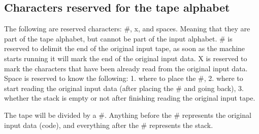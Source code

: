 \documentclass{article}
\begin{document}
\subsection{Characters reserved for the tape alphabet}
The following are reserved characters: #, x, and spaces. Meaning that they are part of the tape alphabet, but cannot be part of the 
input alphabet. # is reserved to delimit the end of the original input tape, as soon as the machine starts running it will mark the 
end of the original input data. X is reserved to mark the characters that have been already read from the original input data. 
Space is reserved to know the following: 1. where to place the #, 2. where to start reading the original input data (after placing 
the # and going back), 3. whether the stack is empty or not after finishing reading the original input tape.

The tape will be divided by a #. Anything before the # represents the original input data (code), and everything after the 
# represents the stack. 
\end{document}
